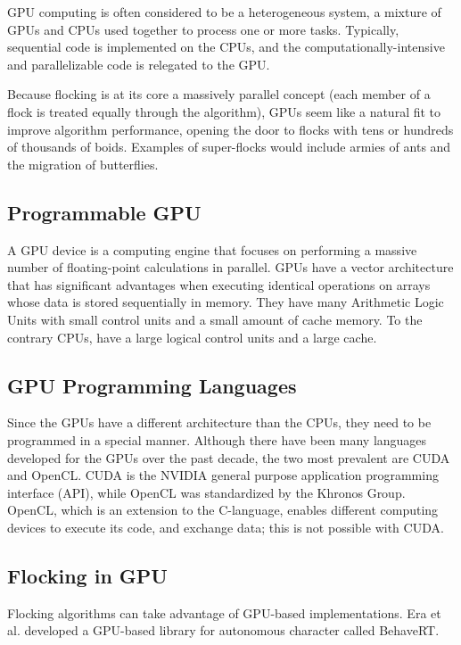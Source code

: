 GPU computing is often considered to be a heterogeneous system, a mixture of GPUs and CPUs used together to process one or more tasks. Typically, sequential code is implemented on the CPUs, and the computationally-intensive and parallelizable code is relegated to the GPU.

Because flocking is at its core a massively parallel concept (each member of a flock is treated equally through the algorithm), GPUs seem like a natural fit to improve algorithm performance, opening the door to flocks with tens or hundreds of thousands of boids. Examples of super-flocks would include armies of ants and the migration of butterflies. 


\subsection{Programmable GPU}
A GPU device is a computing engine\cite{GPUbook} that focuses on performing a massive number of floating-point calculations in parallel. GPUs have a vector architecture that has significant advantages when executing identical operations on arrays whose data is stored sequentially in memory. They have many Arithmetic Logic Units with small control units and a small amount of cache memory. 
To the contrary CPUs, have a large logical control units and a large cache. 

\subsection{GPU Programming Languages}
Since the GPUs have a different architecture than the CPUs, they need to be programmed in a special manner. Although there have been many languages developed for the GPUs over the past decade, the two most prevalent are CUDA and OpenCL. CUDA is the NVIDIA  general purpose application programming interface (API)\cite{CUDAandOpenCL}, while OpenCL was standardized by the Khronos Group\cite{opencl}. OpenCL, which is an extension to the C-language,  enables different computing devices to execute its code, and exchange data; this is not 
possible with CUDA.
 
\subsection{Flocking in GPU}\label{flockingGPU}
Flocking algorithms can take advantage of GPU-based implementations. Era et al.\cite{BehaveRT} developed a GPU-based library for autonomous character called BehaveRT.

